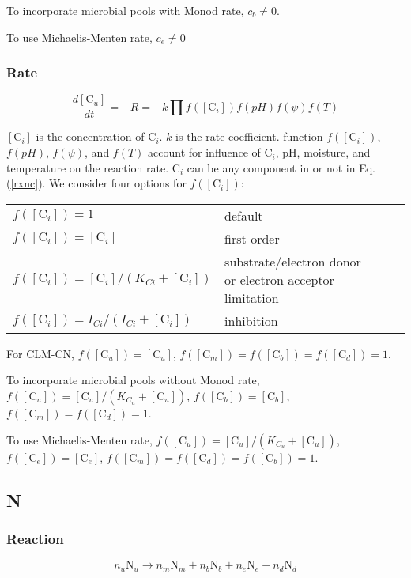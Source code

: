 \documentclass[12pt, a4paper]{article}
\begin{document}
To incorporate microbial pools with Monod rate, $c_b \neq 0$.

To use Michaelis-Menten rate, $c_e \neq 0$

\subsubsection{Rate}
\begin{equation}
\label{ratec}
\frac{d[\text{C}_u]}{dt} = -R = -k \prod f([\text{C}_i]) f(pH)f(\psi)f(T)
\end{equation}

$[\text{C}_i]$ is the concentration of C$_i$. $k$ is the rate coefficient. function $f([\text{C}_i])$, $f(pH)$, $f(\psi)$, and $f(T)$ account for influence of $\text{C}_i$, pH, moisture, and temperature on the reaction rate. $\text{C}_i$ can be any component in or not in Eq. (\ref{rxnc}). We consider four options for $f([\text{C}_i])$:

\begin{tabular}{llll}
$f([\text{C}_i]) = 1$ & default \\
$f([\text{C}_i]) = [\text{C}_i]$ & first order \\
$f([\text{C}_i]) = [\text{C}_i]/(K_{Ci} + [\text{C}_i])$ & substrate/electron donor or electron acceptor limitation \\
$f([\text{C}_i]) = I_{Ci}/(I_{Ci} + [\text{C}_i])$ & inhibition \\
\end{tabular}

For CLM-CN, $f([\text{C}_u])=[\text{C}_u]$,  $f([\text{C}_m])=f([\text{C}_b])=f([\text{C}_d]) = 1$.

To incorporate microbial pools without Monod rate, $f([\text{C}_u])=[\text{C}_u]/(K_{C_u}+[\text{C}_u])$, $f([\text{C}_b])=[\text{C}_b]$,  $f([\text{C}_m])=f([\text{C}_d]) = 1$.

To use Michaelis-Menten rate, $f([\text{C}_u])=[\text{C}_u]/(K_{C_u}+[\text{C}_u])$, $f([\text{C}_e])=[\text{C}_e]$,  $f([\text{C}_m])=f([\text{C}_d]) = f([\text{C}_b])= 1$.

\subsection{N}
\subsubsection{Reaction}
\begin{equation}
n_u \text{N}_u \rightarrow n_m \text{N}_m + n_b \text{N}_b + n_e \text{N}_e + n_d \text{N}_d
\end{equation}
\end{document}

